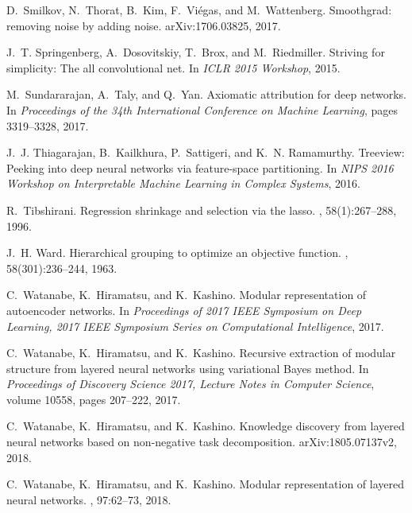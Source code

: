 \documentclass{article}
\begin{document}
\begin{thebibliography}{10}
D.~Smilkov, N.~Thorat, B.~Kim, F.~Vi{\'e}gas, and M.~Wattenberg.
\newblock Smoothgrad: removing noise by adding noise.
\newblock arXiv:1706.03825, 2017.

J.~T. Springenberg, A.~Dosovitskiy, T.~Brox, and M.~Riedmiller.
\newblock Striving for simplicity: The all convolutional net.
\newblock In {\em ICLR 2015 Workshop}, 2015.

M.~Sundararajan, A.~Taly, and Q.~Yan.
\newblock Axiomatic attribution for deep networks.
\newblock In {\em Proceedings of the 34th International Conference on Machine
  Learning}, pages 3319--3328, 2017.

J.~J. Thiagarajan, B.~Kailkhura, P.~Sattigeri, and K.~N. Ramamurthy.
\newblock Treeview: Peeking into deep neural networks via feature-space
  partitioning.
\newblock In {\em NIPS 2016 Workshop on Interpretable Machine Learning in
  Complex Systems}, 2016.

R.~Tibshirani.
\newblock Regression shrinkage and selection via the lasso.
,
  58(1):267--288, 1996.

J.~H. Ward.
\newblock Hierarchical grouping to optimize an objective function.
,
  58(301):236--244, 1963.

C.~Watanabe, K.~Hiramatsu, and K.~Kashino.
\newblock Modular representation of autoencoder networks.
\newblock In {\em Proceedings of 2017 IEEE Symposium on Deep Learning, 2017
  IEEE Symposium Series on Computational Intelligence}, 2017.

C.~Watanabe, K.~Hiramatsu, and K.~Kashino.
\newblock Recursive extraction of modular structure from layered neural
  networks using variational {B}ayes method.
\newblock In {\em Proceedings of Discovery Science 2017, Lecture Notes in
  Computer Science}, volume 10558, pages 207--222, 2017.

C.~Watanabe, K.~Hiramatsu, and K.~Kashino.
\newblock Knowledge discovery from layered neural networks based on
  non-negative task decomposition.
\newblock arXiv:1805.07137v2, 2018.

C.~Watanabe, K.~Hiramatsu, and K.~Kashino.
\newblock Modular representation of layered neural networks.
, 97:62--73, 2018.


\end{thebibliography}
\end{document}
